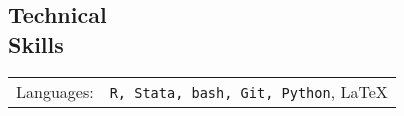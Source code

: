 \documentclass[margin,line,pifont,palatino,courier]{res}
\begin{document}
\begin{resume}






\section{\sc Technical \\ Skills}

\begin{tabular}{@{}p{0.8in}p{6in}}

Languages:& \verb+R, Stata, bash, Git, Python+, \LaTeX   \\

\end{tabular}




\end{resume}
\end{document}
